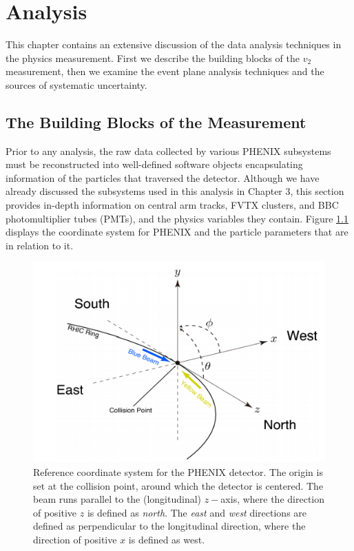 \chapter{Analysis}
This chapter contains an extensive discussion of the data analysis techniques in the physics measurement. First we describe the building blocks of the  $v_2$ measurement, then we examine the event plane analysis techniques and the sources of systematic uncertainty.
\section{The Building Blocks of the Measurement}
Prior to any analysis, the raw data collected by various PHENIX subsystems must be reconstructed into well-defined software objects encapsulating information of the particles that traversed the detector. Although we have already discussed the subsystems used in this analysis in Chapter 3, this section provides in-depth information on central arm tracks, FVTX clusters, and BBC photomultiplier tubes (PMTs), and the physics variables they contain. Figure \ref{fig:phenix_coord_system} displays the coordinate system for PHENIX and the particle parameters that are in relation to it.


\begin{figure}[!ht]
\begin{center}
\includegraphics[width=0.55\linewidth]{figs/phenix_coord.png}
\caption{Reference coordinate system for the PHENIX detector. The origin is set at the collision point, around which the detector is centered. The beam runs parallel to the (longitudinal) $z-$axis, where the direction of positive $z$ is defined as \emph{north}. The \emph{east} and \emph{west} directions are defined as perpendicular to the longitudinal direction, where the direction of positive $x$ is defined as west.}
\label{fig:phenix_coord_system}
\end{center}
\end{figure}

